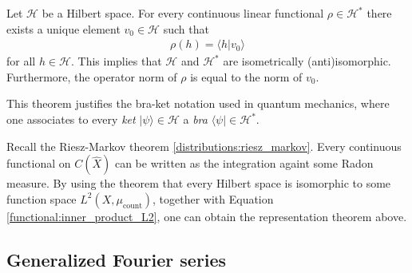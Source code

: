     \begin{theorem}\label{functional:riesz}
        Let $\mathcal{H}$ be a Hilbert space. For every continuous linear functional $\rho\in\mathcal{H}^*$ there exists a unique element $v_0\in\mathcal{H}$ such that
        \begin{gather}
            \rho(h) = \langle h|v_0 \rangle
        \end{gather}
        for all $h\in\mathcal{H}$. This implies that $\mathcal{H}$ and $\mathcal{H}^*$ are isometrically (anti)isomorphic. Furthermore, the operator norm of $\rho$ is equal to the norm of $v_0$.
    \end{theorem}
    \begin{remark}
        This theorem justifies the bra-ket notation used in quantum mechanics, where one associates to every \textit{ket} $|\psi\rangle\in\mathcal{H}$ a \textit{bra} $\langle\psi|\in\mathcal{H}^*$.
    \end{remark}

    \begin{remark}
        Recall the Riesz-Markov theorem \ref{distributions:riesz_markov}. Every continuous functional on $C(\widehat{X})$ can be written as the integration againt some Radon measure. By using the theorem that every Hilbert space is isomorphic to some function space $L^2(X,\mu_\mathrm{count})$, together with Equation \eqref{functional:inner_product_L2}, one can obtain the representation theorem above.
    \end{remark}

\subsection{Generalized Fourier series}

